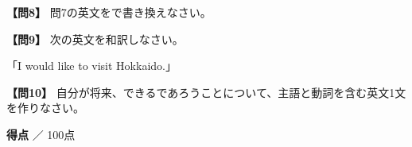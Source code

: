 \noindent\textbf{【問8】} 問7の英文をで書き換えなさい。

\testqsep

\noindent\textbf{【問9】} 次の英文を和訳しなさい。

「I would like to visit Hokkaido.」

\testqsep

\noindent\textbf{【問10】} 自分が将来、できるであろうことについて、主語と動詞を含む英文1文を作りなさい。

\testqsep

\begin{flushright}
\textbf{得点} \underline{\hspace{8em}} ／ 100点
\end{flushright}
